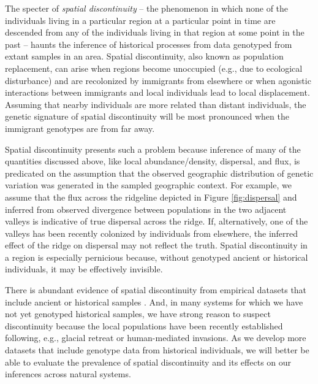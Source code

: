\documentclass{ar-1col}
\newcommand{\todo}[1]{{\textbf{\color{red}{#1}}}}
\begin{document}
The specter of \textit{spatial discontinuity} --
the phenomenon in which none of the individuals 
living in a particular region at a particular point in time 
are descended from any of the individuals living in that region 
at some point in the past
-- haunts the inference of historical processes
from data genotyped from extant samples in an area.
Spatial discontinuity, 
also known as population replacement, 
can arise when regions become unoccupied
(e.g., due to ecological disturbance) 
and are recolonized by immigrants from elsewhere or 
when agonistic interactions between immigrants and local individuals 
lead to local displacement. 
Assuming that nearby individuals are more related than distant individuals, 
the genetic signature of spatial discontinuity will be most pronounced 
when the immigrant genotypes are from far away.

Spatial discontinuity presents such a problem because 
inference of many of the quantities discussed above, 
like local abundance/density, dispersal, and flux, 
is predicated on the assumption that 
the observed geographic distribution of genetic variation 
was generated in the sampled geographic context.
For example, 
we assume that the flux across the ridgeline 
depicted in Figure \ref{fig:dispersal}
and inferred from observed divergence 
between populations in the two adjacent valleys 
is indicative of true dispersal across the ridge.
If, alternatively, one of the valleys 
has been recently colonized by individuals from elsewhere, 
the inferred effect of the ridge on dispersal may not reflect the truth.
Spatial discontinuity in a region is especially pernicious because, 
without genotyped ancient or historical individuals, 
it may be effectively invisible.

There is abundant evidence of spatial discontinuity 
from empirical datasets that include ancient or historical samples 
\citep{bi2013unlocking, PickrellReich2014, lazaridis_ancient_2014, haak2015massive, allentoft2015population, joseph2018inference}.
And, in many systems for which we have not yet genotyped historical samples, 
we have strong reason to suspect discontinuity 
because the local populations have been recently established 
following, e.g., glacial retreat or human-mediated invasions.
As we develop more datasets that include genotype data from historical individuals, 
we will better be able to evaluate the prevalence of spatial discontinuity 
and its effects on our inferences across natural systems. 

\todo{read through and edit}
\end{document}
